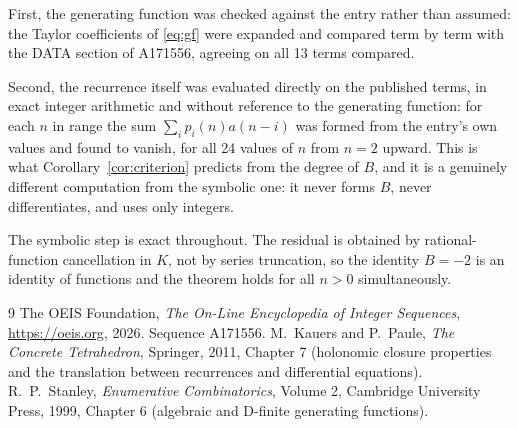 \documentclass[11pt,a4paper]{article}
\theoremstyle{plain}
\theoremstyle{definition}
\begin{document}
First, the generating function was checked against the entry rather than assumed: the
Taylor coefficients of \eqref{eq:gf} were expanded and compared term by term with the DATA
section of A171556, agreeing on all 13 terms compared.

Second, the recurrence itself was evaluated directly on the published terms, in exact
integer arithmetic and without reference to the generating function: for each $n$ in range
the sum $\sum_{i}p_{i}(n)a(n-i)$ was formed from the entry's own values and found to
vanish, for all 24 values of $n$ from $n=2$ upward. This is what
Corollary~\ref{cor:criterion} predicts from the degree of $B$, and it is a genuinely
different computation from the symbolic one: it never forms $B$, never differentiates, and
uses only integers.

The symbolic step is exact throughout. The residual is obtained by rational-function
cancellation in $K$, not by series truncation, so the identity $B=-2$ is an
identity of functions and the theorem holds for all $n>0$ simultaneously.

\begin{thebibliography}{9}
 The OEIS Foundation, \emph{The On-Line Encyclopedia of Integer Sequences},
\url{https://oeis.org}, 2026. Sequence A171556.
 M.~Kauers and P.~Paule, \emph{The Concrete Tetrahedron}, Springer, 2011,
Chapter 7 (holonomic closure properties and the translation between recurrences and
differential equations).
 R.~P.~Stanley, \emph{Enumerative Combinatorics}, Volume 2, Cambridge
University Press, 1999, Chapter 6 (algebraic and D-finite generating functions).
\end{thebibliography}
\end{document}
